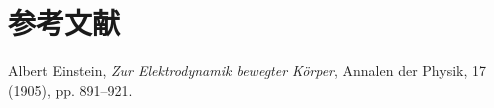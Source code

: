 \documentclass{report}
\begin{document}
\section{参考文献}
\begin{thebibliography}{9}
  Albert Einstein,
  \textit{Zur Elektrodynamik bewegter Körper},
  Annalen der Physik, 17 (1905), pp. 891–921.
\end{thebibliography}
\end{document}
